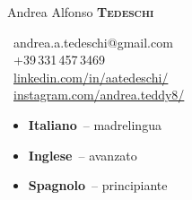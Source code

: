\begin{minipage}[t]{0.33\textwidth} %
\colorbox{cvblue}{\begin{minipage}[t][5mm][t]{\textwidth}\null\hfill\null\end{minipage}}

\vspace{-.2ex} 						%
\colorbox{cvblue!90}{\color{white}  %
	\textwidth\relax		%
	\begin{minipage}[t][293mm][t]{0.82\textwidth}
	\raggedright
	\vspace*{2.5ex}

	\Large Andrea Alfonso \textbf{\textsc{Tedeschi}} \normalsize 

	\begin{center}
	\end{center}

	\vspace*{0.5ex} %

	\small %
	\MVAt\ {\small andrea.a.tedeschi@gmail.com} \\[0.4ex]
	\Telefon\ +39\,331\,457\,3469 \\[0.5ex]
	\faLinkedin\ \href{https://www.linkedin.com/in/aatedeschi/}{linkedin.com/in/aatedeschi/} \\[0.1ex]
	\faInstagram\ \href{https://www.instagram.com/andrea.teddy8/}{instagram.com/andrea.teddy8/} \\[0.1ex]

	

	\begin{itemize}
		\item \textbf{Italiano}~-- madrelingua \\
		\item \textbf{Inglese}~-- avanzato \\
		\item \textbf{Spagnolo}~-- principiante \\
	\end{itemize} 


\end{minipage}}
\end{minipage}
